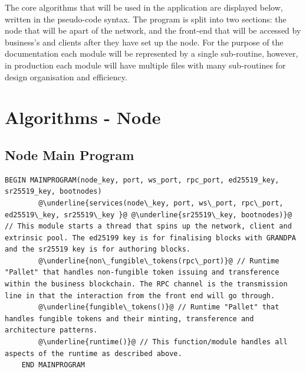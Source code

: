 The core algorithms that will be used in the application are displayed below, written in the pseudo-code syntax. The program is split into two sections: the node that will be apart of the network, and the front-end that will be accessed by business's and clients after they have set up the node. For the purpose of the documentation each module will be represented by a single sub-routine, however, in production each module will have multiple files with many sub-routines for design organisation and efficiency. \\

\section{Algorithms - Node}
\subsection{Node Main Program}

\begin{lstlisting}[caption=Main Program, escapechar=\@]
	BEGIN MAINPROGRAM(node_key, port, ws_port, rpc_port, ed25519_key, sr25519_key, bootnodes)
		@\underline{services(node\_key, port, ws\_port, rpc\_port, ed25519\_key, sr25519\_key }@ @\underline{sr25519\_key, bootnodes)}@ // This module starts a thread that spins up the network, client and extrinsic pool. The ed25199 key is for finalising blocks with GRANDPA and the sr25519 key is for authoring blocks.
		@\underline{non\_fungible\_tokens(rpc\_port)}@ // Runtime "Pallet" that handles non-fungible token issuing and transference within the business blockchain. The RPC channel is the transmission line in that the interaction from the front end will go through.
		@\underline{fungible\_tokens()}@ // Runtime "Pallet" that handles fungible tokens and their minting, transference and architecture patterns.
		@\underline{runtime()}@ // This function/module handles all aspects of the runtime as described above.
	END MAINPROGRAM

\end{lstlisting}
